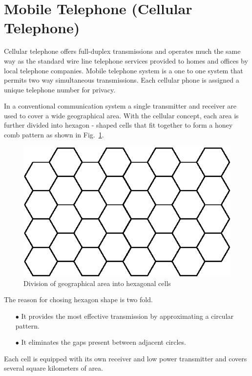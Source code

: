 \section{Mobile Telephone (Cellular Telephone)}\label{sec10.3}

Cellular telephone offers full-duplex transmissions and operates much the same way as the standard wire line telephone services provided to homes and offices by local telephone companies. Mobile telephone system is a one to one system that permits two way simultaneous transmissions. Each cellular phone is assigned a unique telephone number for privacy. 

In a conventional communication system a single transmitter and receiver are used to cover a wide geographical area. With the cellular concept, each area is further divided into hexagon - shaped cells that fit together to form a honey comb pattern as shown in Fig.~\ref{fig10.3}.
\begin{figure}[H]
\centering
\includegraphics{chap10/fig10.3.eps}
\caption{Division of geographical area into hexagonal cells}\label{fig10.3}
\end{figure}

The reason for chosing hexagon shape is two fold.
\begin{itemize}
\item[$\bullet$] It provides the most effective transmission by approximating a circular pattern.

\item[$\bullet$] It eliminates the gaps present between adjacent circles.
\end{itemize}

Each cell is equipped with its own receiver and low power transmitter and covers several square kilometers of area.

